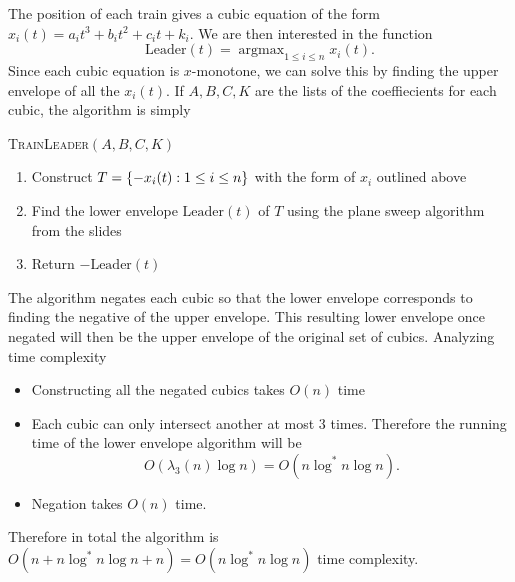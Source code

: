 \documentclass[12pt]{extarticle}
\DeclareMathOperator*{\argmax}{argmax}
\begin{document}
\begin{solution}
    The position of each train gives a cubic equation of the form $x_i(t) = a_i t^3 + b_i t^2 + c_i t + k_i$. We are then interested in the function
    \[
        \text{Leader}(t) = \argmax_{1\leq i \leq n} x_i(t)
    .\]
    Since each cubic equation is $x$-monotone, we can solve this by finding the upper envelope of all the $x_i(t)$. If $A,B,C,K$ are the lists of the coeffiecients for each cubic, the algorithm is simply
    \begin{algorithm}[H]
        \caption{\textsc{TrainLeader}$(A, B, C, K)$}
        \begin{enumerate}
            \item Construct $T = \qty{-x_i(t) : 1 \leq i \leq n}$ with the form of $x_i$ outlined above
            \item Find the lower envelope $\text{Leader}(t)$ of $T$ using the plane sweep algorithm from the slides
            \item Return $-\text{Leader}(t)$
        \end{enumerate}
    \end{algorithm}
    The algorithm negates each cubic so that the lower envelope corresponds to finding the negative of the upper envelope. This resulting lower envelope once negated will then be the upper envelope of the original set of cubics. Analyzing time complexity
    \begin{itemize}
        \item Constructing all the negated cubics takes $O(n)$ time
        \item Each cubic can only intersect another at most $3$ times. Therefore the running time of the lower envelope algorithm will be 
            \[
                O(\lambda_3(n) \log n) = O(n \log^* n \log n)
            .\]
        \item Negation takes $O(n)$ time.
    \end{itemize}
    Therefore in total the algorithm is $O(n + n \log^* n \log n + n) = O(n \log^* n \log n)$ time complexity.
\end{solution}
\end{document}
